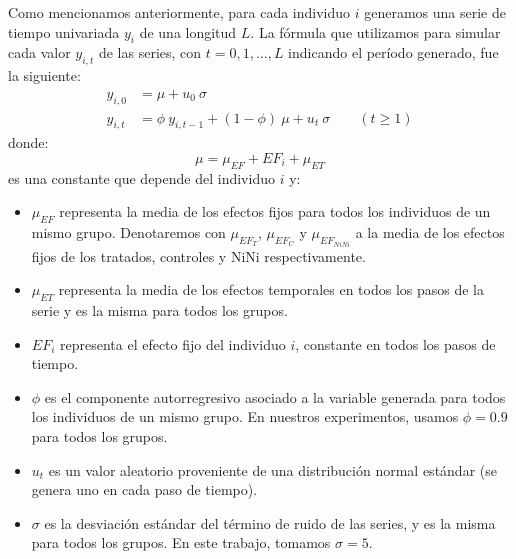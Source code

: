 \documentclass[../../main.tex]{subfiles}
\begin{document}
Como mencionamos anteriormente, para cada individuo \(i\) generamos una serie de tiempo
univariada \(y_i\) de una longitud \(L\). La fórmula que utilizamos para simular cada
valor \(y_{i,t}\) de las series, con \(t = 0, 1, ..., L\) indicando el período generado,
fue la siguiente:
\begin{align}
    y_{i,0} &= \mu + u_0  \ \sigma \\
    y_{i,t} &= \phi \ y_{i,t-1} + (1 - \phi) \ \mu +  u_t \ \sigma \qquad (t \ge 1)
\end{align}
donde:
\[
    \mu = \mu_{EF} + EF_i + \mu_{ET}
\]
es una constante que depende del individuo \(i\) y:
\begin{itemize}[itemsep=0.1cm]
    \item \(\mu_{EF}\) representa la media de los efectos fijos para todos los individuos
    de un mismo grupo. Denotaremos con \(\mu_{EF_T}\), \(\mu_{EF_C}\) y
    \(\mu_{EF_{NiNi}}\) a la media de los efectos fijos de los tratados, controles y NiNi
    respectivamente.
    \item \(\mu_{ET}\) representa la media de los efectos temporales en todos los pasos
    de la serie y es la misma para todos los grupos.
    \item \(EF_i\) representa el efecto fijo del individuo \(i\), constante en todos
    los pasos de tiempo.
    \item \(\phi\) es el componente autorregresivo asociado a la variable generada para
    todos los individuos de un mismo grupo. En nuestros experimentos, usamos \(\phi = 0.9\)
    para todos los grupos.
    \item \(u_t\) es un valor aleatorio proveniente de una distribución normal estándar
    (se genera uno en cada paso de tiempo).
    \item \(\sigma\) es la desviación estándar del término de ruido de las series,
    y es la misma para todos los grupos. En este trabajo, tomamos \(\sigma=5\).
\end{itemize}
\end{document}

